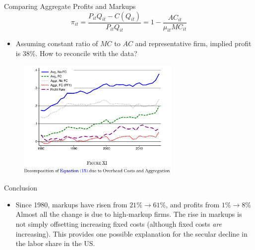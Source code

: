 \documentclass{beamer}
\begin{document}
  \begin{frame}{Comparing Aggregate Profits and Markups}
    \[
\pi_{it} = \frac{P_{it} Q_{it} - C(Q_{it})}{P_{it} Q_{it}} = 1 - \frac{AC_{it}}{\mu_{it} MC_{it}} \tag{15}
    \] 
    \begin{itemize}
    \item Assuming constant ratio of $MC$ to $AC$ and representative firm, implied profit is 38\%. How to reconcile with the data?
    \end{itemize}
    \begin{figure}[htp]
      \centering
      \includegraphics[width=0.7\textwidth, keepaspectratio=true]{fig15.png}
    \end{figure}
  \end{frame}
  \begin{frame}{Conclusion}
    \begin{itemize}
    \item Since 1980, markups have risen from $21\% \to 61\%$, and profits from $1\% \to 8\%$
      \vitem Almost all the change is due to high-markup firms.
      \vitem The rise in markups is not simply offsetting increasing fixed costs (although fixed costs \emph{are} increasing).
      \vitem This provides one possible explanation for the secular decline in the labor share in the US.
    \end{itemize}
  \end{frame}
\end{document}
